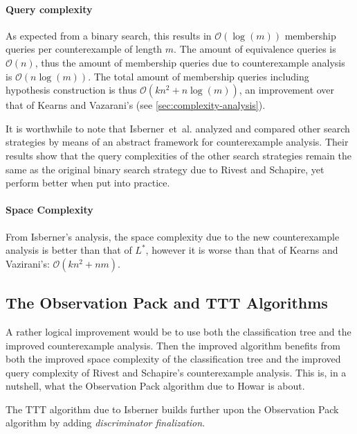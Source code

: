 \documentclass[multi,crop=false,class=article]{standalone}
\begin{document}
\paragraph{Query complexity} As expected from a binary search, this results in
$\mathcal{O}(\log(m))$ membership queries per counterexample of length $m$. The
amount of equivalence queries is $\mathcal{O}(n)$, thus the amount of membership
queries due to counterexample analysis is $\mathcal{O}(n\log(m))$. The total
amount of membership queries including hypothesis construction is thus
$\mathcal{O}(kn^2 + n\log(m))$, an improvement over that of Kearns and
Vazarani's (see \cref{sec:complexity-analysis}).

It is worthwhile to note that Isberner~et~al. analyzed and compared other search
strategies by means of an abstract framework for counterexample
analysis\cite{Isberner2014a}. Their results show that the query complexities of
the other search strategies remain the same as the original binary search
strategy due to Rivest and Schapire, yet perform better when put into practice.

\paragraph{Space Complexity} From Isberner's analysis\cite{Isberner2014b}, the
space complexity due to the new counterexample analysis is better than that of
$L^*$, however it is worse than that of Kearns and Vazirani's:
$\mathcal{O}(kn^2 + nm)$.

\subsection{The Observation Pack and TTT Algorithms}
\label{sec:ttt}
A rather logical improvement would be to use both the classification tree and
the improved counterexample analysis. Then the improved algorithm benefits from
both the improved space complexity of the classification tree and the improved
query complexity of Rivest and Schapire's counterexample analysis. This is, in a
nutshell, what the Observation Pack algorithm due to Howar is
about\cite{Howar2012a,Isberner2015a}. 

The TTT algorithm due to Isberner\cite{Isberner2014b} builds further upon the
Observation Pack algorithm by adding \textit{discriminator finalization}.
\end{document}
